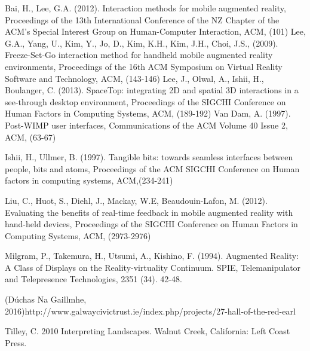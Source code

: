 Bai, H., Lee, G.A. (2012). Interaction methods for mobile augmented reality, Proceedings of the 13th International Conference of the NZ Chapter of the ACM's Special Interest Group on Human-Computer Interaction, ACM, (101)
Lee, G.A., Yang, U., Kim, Y., Jo, D., Kim, K.H., Kim, J.H., Choi, J.S.,  (2009). Freeze-Set-Go interaction method for handheld mobile augmented reality environments, Proceedings of the 16th ACM Symposium on Virtual Reality Software and Technology, ACM, (143-146)
Lee, J., Olwal, A., Ishii, H., Boulanger, C. (2013). SpaceTop: integrating 2D and spatial 3D interactions in a see-through desktop environment, Proceedings of the SIGCHI Conference on Human Factors in Computing Systems, ACM, (189-192)
Van Dam, A. (1997). Post-WIMP user interfaces, Communications of the ACM Volume 40 Issue 2, ACM, (63-67)

Ishii, H., Ullmer, B. (1997). Tangible bits: towards seamless interfaces between people, bits and atoms, Proceedings of the ACM SIGCHI Conference on Human factors in computing systems, ACM,(234-241)

Liu, C., Huot, S., Diehl, J., Mackay, W.E, Beaudouin-Lafon, M.  (2012). Evaluating the benefits of real-time feedback in mobile augmented reality with hand-held devices, Proceedings of the SIGCHI Conference on Human Factors in Computing Systems, ACM, (2973-2976)

Milgram, P., Takemura, H., Utsumi, A., Kishino, F. (1994). Augmented Reality: A Class of Displays on the Reality-virtuality Continuum. SPIE, Telemanipulator and Telepresence Technologies, 2351 (34). 42-48.

(Dúchas Na Gaillmhe, 2016)http://www.galwaycivictrust.ie/index.php/projects/27-hall-of-the-red-earl

Tilley, C. 2010 Interpreting Landscapes. Walnut Creek, California: Left Coast Press.